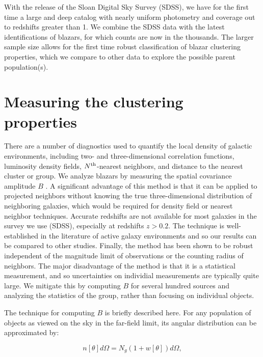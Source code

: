 \documentclass{emulateapj}
\begin{document}
With the release of the Sloan Digital Sky Survey (SDSS), we have for the first time a large and deep catalog with nearly uniform photometry and coverage out to redshifts greater than 1. We combine the SDSS data with the latest identifications of blazars, for which counts are now in the thousands. The larger sample size allows for the first time robust classification of blazar clustering properties, which we compare to other data to explore the possible parent population(s).


\section{Measuring the clustering properties}\label{sec-methods}

There are a number of diagnostics used to quantify the local density of galactic environments, including two- and three-dimensional correlation functions, luminosity density fields, $N^{{\rm th}}$-nearest neighbors, and distance to the nearest cluster or group. We analyze blazars by measuring the spatial covariance amplitude $B$ \citep{lon79}. A significant advantage of this method is that it can be applied to projected neighbors without knowing the true three-dimensional distribution of neighboring galaxies, which would be required for density field or nearest neighbor techniques. Accurate redshifts are not available for most galaxies in the survey we use (SDSS), especially at redshifts $z>0.2$. The technique is well-established in the literature of active galaxy environments \citep[e.g.,][]{pre88,yee87,ell89,wur97} and so our results can be compared to other studies. Finally, the method has been shown to be robust independent of the magnitude limit of observations or the counting radius of neighbors. The major disadvantage of the method is that it is a statistical measurement, and so uncertainties on individial measurements are typically quite large. We mitigate this by computing $B$ for several hundred sources and analyzing the statistics of the group, rather than focusing on individual objects. 

The technique for computing $B$ is briefly described here. For any population of objects as viewed on the sky in the far-field limit, its angular distribution can be approximated by:

\begin{equation}
\label{eqn-angcov}
n[\theta]d\Omega = N_g (1 + w[\theta]) d\Omega,
\end{equation}
\end{document}
